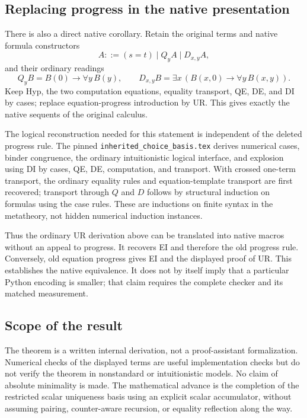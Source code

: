 \subsection{Replacing progress in the native presentation}
There is also a direct native corollary.  Retain the original terms and
native formula constructors
\[
 A::=(s=t)\mid Q_y A\mid D_{x,y} A,
\]
and their ordinary readings
\[
 Q_y B=B(0)\to\forall y\,B(y),\qquad
 D_{x,y}B=\exists x\,(B(x,0)\to\forall y\,B(x,y)).
\]
Keep Hyp, the two computation equations, equality transport, QE, DE,
and DI by cases; replace equation-progress introduction by UR.
This gives exactly the native sequents of the original calculus.

The logical reconstruction needed for this statement is independent of
the deleted progress rule.  The pinned \texttt{inherited\_choice\_basis.tex}
derives numerical cases, binder congruence, the ordinary intuitionistic
logical interface, and explosion using DI by cases, QE, DE, computation,
and transport.  With crossed one-term transport, the ordinary equality
rules and equation-template transport are first recovered; transport
through $Q$ and $D$ follows by structural induction on formulas using
the case rules.  These are inductions on finite syntax in the metatheory,
not hidden numerical induction instances.

Thus the ordinary UR derivation above can be translated into native
macros without an appeal to progress.  It recovers EI and therefore the
old progress rule.  Conversely, old equation progress gives EI and
the displayed proof of UR.  This establishes the native equivalence.
It does not by itself imply that a particular Python encoding is smaller;
that claim requires the complete checker and its matched measurement.

\subsection{Scope of the result}
The theorem is a written internal derivation, not a proof-assistant
formalization.  Numerical checks of the displayed terms are useful
implementation checks but do not verify the theorem in nonstandard or
intuitionistic models.  No claim of absolute minimality is made.
The mathematical advance is the completion of the restricted scalar
uniqueness basis using an explicit scalar accumulator, without assuming
pairing, counter-aware recursion, or equality reflection along the way.
